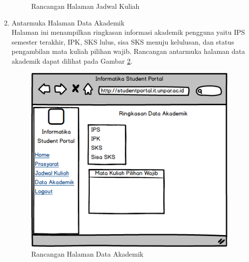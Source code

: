 \begin{enumerate}
\begin{figure}[H]
			\caption{Rancangan Halaman Jadwal Kuliah} 
			\label{fig:4_ranc_kuliah}
		\end{figure}
	\item {Antarmuka Halaman Data Akademik}\\
	Halaman ini menampilkan ringkasan informasi akademik pengguna yaitu IPS semester terakhir, IPK, SKS lulus, sisa SKS menuju kelulusan, dan status pengambilan mata kuliah pilihan wajib. Rancangan antarmuka halaman data akademik dapat dilihat pada Gambar \ref{fig:4_ranc_ringkasan}.
	\begin{figure}[H]
			\centering
			\includegraphics[scale=0.5]{Gambar/Ringkasan_Page}
			\caption{Rancangan Halaman Data Akademik} 
			\label{fig:4_ranc_ringkasan}
		\end{figure}
\end{enumerate}
